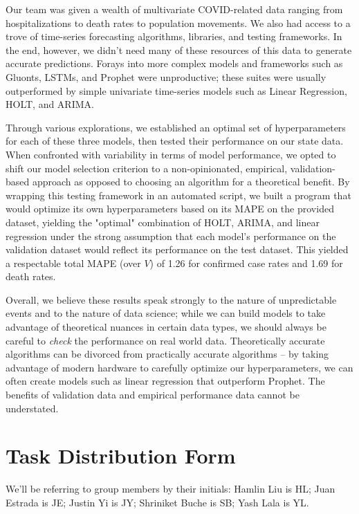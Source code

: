\documentclass[sigconf,nonacm]{acmart}
\begin{document}
Our team was given a wealth of multivariate COVID-related data ranging from
hospitalizations to death rates to population movements. We also had access to
a trove of time-series forecasting algorithms, libraries, and testing
frameworks. In the end, however, we didn't need many of these resources of this
data to generate accurate predictions. 
Forays into more complex models and frameworks such as Gluonts, LSTMs, and
Prophet were unproductive; these suites were usually outperformed by simple
univariate time-series models such as Linear Regression, HOLT, and ARIMA. 

Through various explorations, we established an optimal set of hyperparameters
for each of these three models, then tested their performance on our state
data. When confronted with variability in terms of model performance, we opted
to shift our model selection criterion to a non-opinionated, empirical,
validation-based approach as opposed to choosing an algorithm for a theoretical
benefit. By wrapping this testing framework in an automated script, we built a
program that would optimize its own hyperparameters based on its MAPE on the
provided dataset, yielding the "optimal" combination of HOLT, ARIMA, and linear
regression under the strong assumption that each model's performance on the
validation dataset would reflect its performance on the test dataset. 
This yielded a respectable total MAPE (over $V$) of 1.26 for confirmed case
rates and 1.69 for death rates. 

Overall, we believe these results speak strongly to the nature of unpredictable
events and to the nature of data science; while we can build models to take
advantage of theoretical nuances in certain data types, we should always be
careful to \emph{check} the performance on real world data. Theoretically
accurate algorithms can be divorced from practically accurate algorithms -- by
taking advantage of modern hardware to carefully optimize our hyperparameters,
we can often create models such as linear regression that outperform Prophet.
The benefits of validation data and empirical performance data cannot be
understated. 


\section{Task Distribution Form}

We'll be referring to group members by their initials: Hamlin Liu is HL; Juan
Estrada is JE; Justin Yi is JY; Shriniket Buche is SB; Yash Lala is YL. 
\end{document}

